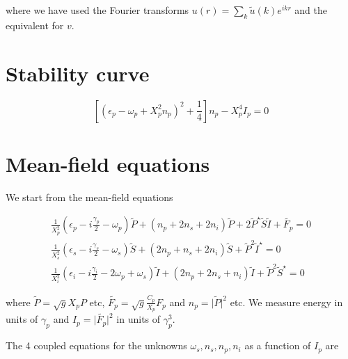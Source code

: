 \documentclass[a4paper,prb,10pt,aps,twocolumn]{revtex4-1}
\begin{document}
where we have used the Fourier transforms $u(r)=\sum_k \widetilde{u}(k) e^{ikr}$ and the equivalent for $v$.

\section{Stability curve}

\begin{equation}
  \label{eq:1}
\left[\left(\epsilon_{p}-\omega_{p}+X_{p}^{2}n_{p}\right)^{2}+\frac{1}{4}\right]n_{p}-X_{p}^{4}I_{p}=0  
\end{equation}

\section{Mean-field equations}

We start from the mean-field equations

\begin{equation}
\begin{aligned}
\frac{1}{X_{p}^{2}}\left(\epsilon_{p}-i\frac{\gamma_{p}}{2}-\omega_{p}\right)\tilde{P}+\left(n_{p}+2n_{s}+2n_{i}\right)\tilde{P}+2\tilde{P}^{\star}\tilde{S}\tilde{I}+\tilde{F_{p}}=0 \\
\frac{1}{X_{s}^{2}}\left(\epsilon_{s}-i\frac{\gamma_{s}}{2}-\omega_{s}\right)\tilde{S}+\left(2n_{p}+n_{s}+2n_{i}\right)\tilde{S}+\tilde{P}^{2}\tilde{I}^{\star}=0 \\
\frac{1}{X_{i}^{2}}\left(\epsilon_{i}-i\frac{\gamma_{i}}{2}-2\omega_{p}+\omega_{s}\right)\tilde{I}+\left(2n_{p}+2n_{s}+n_{i}\right)\tilde{I}+\tilde{P}^{2}\tilde{S}^{\star}=0
\end{aligned}
\end{equation}

where $\tilde{P} = \sqrt{g} X_p P$ etc,
$\tilde{F_p} = \sqrt{g} \frac{C_p}{X_p} F_p$ and
$n_p = \vert \tilde{P} \vert^2$ etc. We measure energy in units of
$\gamma_p$ and $I_{p} = \vert \tilde{F_p} \vert ^2$ in units
of $\gamma_p^3$.

The 4 coupled equations for the unknowns
$\omega_{s},n_{s},n_{p},n_i$ as a function of $I_{p}$ are
\end{document}

